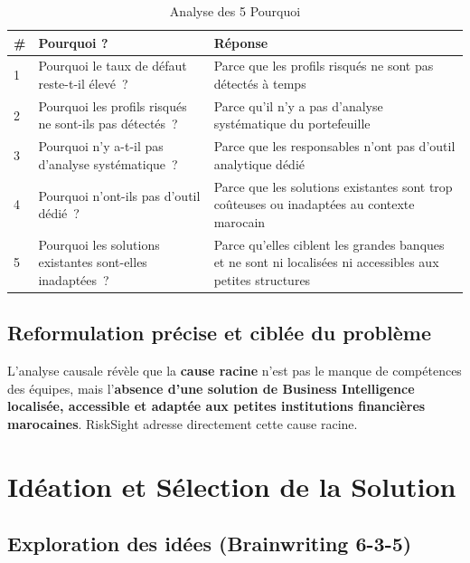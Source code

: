 \documentclass[12pt, a4paper]{report}
\begin{document}
\begin{table}[H]
\centering
\caption{Analyse des 5 Pourquoi}
\label{tab:5pourquoi}
\renewcommand{\arraystretch}{1.4}
\begin{tabularx}{\textwidth}{p{1cm} X X}
\toprule
\rowcolor{primary!12}
\# & Pourquoi ? & Réponse \\
\midrule
1 & Pourquoi le taux de défaut reste-t-il élevé~? & Parce que les profils risqués ne sont pas détectés à temps \\
2 & Pourquoi les profils risqués ne sont-ils pas détectés~? & Parce qu'il n'y a pas d'analyse systématique du portefeuille \\
3 & Pourquoi n'y a-t-il pas d'analyse systématique~? & Parce que les responsables n'ont pas d'outil analytique dédié \\
4 & Pourquoi n'ont-ils pas d'outil dédié~? & Parce que les solutions existantes sont trop coûteuses ou inadaptées au contexte marocain \\
5 & Pourquoi les solutions existantes sont-elles inadaptées~? & Parce qu'elles ciblent les grandes banques et ne sont ni localisées ni accessibles aux petites structures \\
\bottomrule
\end{tabularx}
\end{table}

\subsection{Reformulation précise et ciblée du problème}

L'analyse causale révèle que la \textbf{cause racine} n'est pas le manque de
compétences des équipes, mais l'\textbf{absence d'une solution de Business
Intelligence localisée, accessible et adaptée aux petites institutions financières
marocaines}. RiskSight adresse directement cette cause racine.

\section{Idéation et Sélection de la Solution}

\subsection{Exploration des idées (Brainwriting 6-3-5)}
\end{document}
